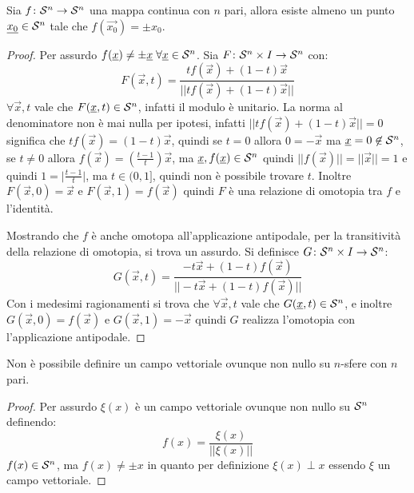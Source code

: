 \begin{corollary}
  Sia $ f \colon \mathcal{S}^{n} \to \mathcal{S}^{n} $ una mappa continua con $ n $ pari, allora esiste almeno
  un punto $ \underline{x_0} \in \mathcal{S}^{n} $ tale che $ f(\vec{x_0}) = \pm x_0 $.
\end{corollary}
\begin{proof}
  Per assurdo $ f(\underline{x}) \not = \pm \underline{x} \; \forall \underline{x} \in \mathcal{S}^{n} $. Sia $ F \colon \mathcal{S}^{n} \times I \to \mathcal{S}^{n} $
  con:
  \[
    F(\vec{x}, t) = \frac{t f(\vec{x}) + (1-t)\vec{x}}{|| t f(\vec{x}) + (1-t)\vec{x} ||}
  \]
  $ \forall \vec{x}, t $ vale che $ F(\underline{x}, t) \in \mathcal{S}^{n} $, infatti il modulo è
  unitario. La norma al denominatore non è mai nulla per ipotesi, infatti
  $ || t f(\vec{x}) + (1-t) \vec{x} || = 0 $ significa che
  $ t f(\vec{x}) = (1-t)\vec{x} $, quindi se $ t = 0 $ allora $ 0 = - \vec{x} $
  ma $ \underline{x} = 0 \not \in \mathcal{S}^{n} $, se $ t \not = 0 $ allora
  $ f(\vec{x}) = \left(\frac{t-1}{t}\right)\vec{x} $, ma
  $ \underline{x}, f(\underline{x}) \in \mathcal{S}^{n} $ quindi
  $ || f(\vec{x}) || = || \vec{x} || = 1 $ e quindi
  $ 1 = \big \rvert \frac{t-1}{t}\big \lvert $, ma $ t \in (0,1] $, quindi non è
  possibile trovare $ t $. Inoltre $ F(\vec{x}, 0) = \vec{x} $ e
  $ F(\vec{x}, 1) = f(\vec{x}) $ quindi $ F $ è una relazione di omotopia tra
  $ f $ e l'identità.

  Mostrando che $ f $ è anche omotopa all'applicazione antipodale, per la
  transitività della relazione di omotopia, si trova un assurdo. Si definisce
  $ G\colon \mathcal{S}^{n} \times I \to \mathcal{S}^{n} $:
  \[
    G(\vec{x}, t) = \frac{-t \vec{x} + (1-t)f(\vec{x})}{|| -t \vec{x} + (1-t)f(\vec{x}) ||}
  \]
  Con i medesimi ragionamenti si trova che $ \forall \vec{x}, t $ vale che
  $ G(\underline{x}, t) \in \mathcal{S}^{n} $, e inoltre $ G(\vec{x}, 0) = f(\vec{x}) $ e
  $ G(\vec{x}, 1) = - \vec{x} $ quindi $ G $ realizza l'omotopia con
  l'applicazione antipodale.
\end{proof}
\begin{corollary}
  Non è possibile definire un campo vettoriale ovunque non nullo
  su $ n $-sfere con $ n $ pari.
\end{corollary}
\begin{proof}
  Per assurdo $ \xi(x) $ è un campo vettoriale ovunque non nullo su $ \mathcal{S}^{n} $  definendo:
  \[
    f(x) = \frac{\xi(x)}{||\xi(x)||}
  \]
  $ f(x) \in \mathcal{S}^{n} $, ma $ f(x) \not = \pm x $ in quanto per definizione
  $ \xi(x) \perp x $ essendo $ \xi $ un campo vettoriale.
\end{proof}

